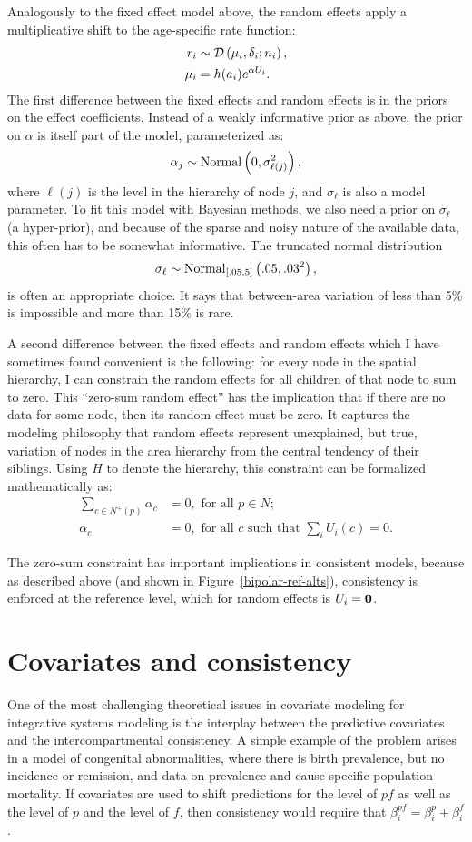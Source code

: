 Analogously to the fixed effect model above, the random effects apply
a multiplicative shift to the age-specific rate function:
\begin{align*}
r_i &\sim \mathcal{D}\left(\mu_i, \delta_i; n_i\right),\\
\mu_i &= h(a_i)e^{\alpha U_i}.
\end{align*}
The first difference between the fixed effects and random effects is
in the priors on the effect coefficients.  Instead of a weakly
informative prior as above, the prior on $\alpha$ is itself part of
the model, parameterized as:
\[
\alpha_j \sim \operatorname{Normal}\left(0, \sigma_{\ell(j)}^2\right),
\]
where $\ell(j)$ is the level in the hierarchy of node $j$, and
$\sigma_\ell$ is also a model parameter. To fit this model with
Bayesian methods, we also need a prior on $\sigma_\ell$ (a
hyper-prior), and because of the sparse and noisy nature of the
available data, this often has to be somewhat informative.  The
truncated normal distribution
\[
\sigma_\ell \sim \operatorname{Normal}_{[.05,5]}\left(.05, .03^2\right),
\]
is often an appropriate choice. It says that between-area variation of
less than 5\% is impossible and more than 15\% is rare.

A second difference between the fixed effects and random effects which
I have sometimes found convenient is
the following: for every node in the spatial hierarchy, I can
constrain the random
effects for all children of that node to sum to zero.  This ``zero-sum
random effect'' has the implication that if there
are no data for some node, then its random effect must be zero.  It
captures the modeling philosophy that random effects represent
unexplained, but true, variation of nodes in the area hierarchy from
the central tendency of their siblings.  Using $H$ to denote the
hierarchy, this constraint can be formalized mathematically as:
\begin{align*}
\sum_{c\in N^+(p)} \alpha_c &= 0, \text{ for all } p \in N;\\
\alpha_c &=0, \text{ for all $c$ such that } \sum_{i} U_i(c) = 0.
\end{align*}

The zero-sum constraint has important implications in consistent
models, because as described above (and shown in
Figure~\ref{bipolar-ref-alts}), consistency is enforced at the
reference level, which for random effects is $U_i = \mathbf{0}$.


\section{Covariates and consistency}
One of the most challenging theoretical issues in covariate modeling
for integrative systems modeling is the interplay between the
predictive covariates and the intercompartmental consistency.  A
simple example of the problem arises in a model of congenital
abnormalities, where there is birth prevalence, but no incidence or
remission, and data on prevalence and cause-specific population
mortality. If covariates are used to shift predictions for the level
of $pf$ as well as the level of $p$ and the level of $f$, then
consistency would require that $\beta^{pf}_i = \beta^p_i + \beta^f_i$.

